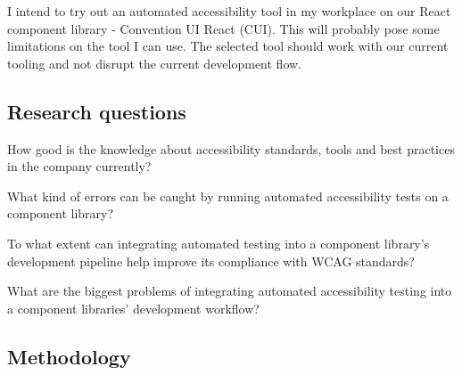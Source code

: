\documentclass{master_thesis}
\begin{document}

I intend to try out an automated accessibility tool in my workplace on our React component library - Convention UI React (CUI). This will probably pose some limitations on the tool I can use. The selected tool should work with our current tooling and not disrupt the current development flow.

\subsection{Research questions}

	\begin{RQlist}
		\item How good is the knowledge about accessibility standards, tools and best practices in the company currently?
		\item What kind of errors can be caught by running automated accessibility tests on a component library?
		\item To what extent can integrating automated testing into a component library's development pipeline help improve its compliance with WCAG standards?
		\item What are the biggest problems of integrating automated accessibility testing into a component libraries' development workflow?
	\end{RQlist}

\subsection{Methodology}
\end{document}
